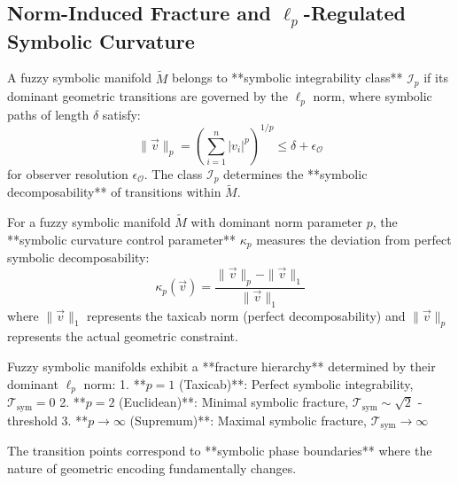 \subsection{Norm-Induced Fracture and \texorpdfstring{$\ell_p$}{lp}-Regulated Symbolic Curvature}
\label{subsec:bk5_norm_induced_fracture_and_lp_regulated_symbolic_curvature}

\begin{definition}
\label{def:bk5_symbolic_integrability_class}
A fuzzy symbolic manifold $\tilde{M}$ belongs to **symbolic integrability class** $\mathcal{I}_p$ if its dominant geometric transitions are governed by the $\ell_p$ norm, where symbolic paths of length $\delta$ satisfy:
$$\|\vec{v}\|_p = \left(\sum_{i=1}^n |v_i|^p\right)^{1/p} \leq \delta + \epsilon_\mathcal{O}$$
for observer resolution $\epsilon_\mathcal{O}$. The class $\mathcal{I}_p$ determines the **symbolic decomposability** of transitions within $\tilde{M}$.
\end{definition}

\begin{definition}
\label{def:bk5_symbolic_curvature_control}
For a fuzzy symbolic manifold $\tilde{M}$ with dominant norm parameter $p$, the **symbolic curvature control parameter** $\kappa_p$ measures the deviation from perfect symbolic decomposability:
$$\kappa_p(\vec{v}) = \frac{\|\vec{v}\|_p - \|\vec{v}\|_1}{\|\vec{v}\|_1}$$
where $\|\vec{v}\|_1$ represents the taxicab norm (perfect decomposability) and $\|\vec{v}\|_p$ represents the actual geometric constraint.
\end{definition}

\begin{theorem}
\label{thm:bk5_lp_norm_fracture_hierarchy}
Fuzzy symbolic manifolds exhibit a **fracture hierarchy** determined by their dominant $\ell_p$ norm:
1. **$p = 1$ (Taxicab)**: Perfect symbolic integrability, $\mathcal{T}_{\text{sym}} = 0$
2. **$p = 2$ (Euclidean)**: Minimal symbolic fracture, $\mathcal{T}_{\text{sym}} \sim \sqrt{2}$ - threshold
3. **$p \to \infty$ (Supremum)**: Maximal symbolic fracture, $\mathcal{T}_{\text{sym}} \to \infty$

The transition points correspond to **symbolic phase boundaries** where the nature of geometric encoding fundamentally changes.
\end{theorem}

